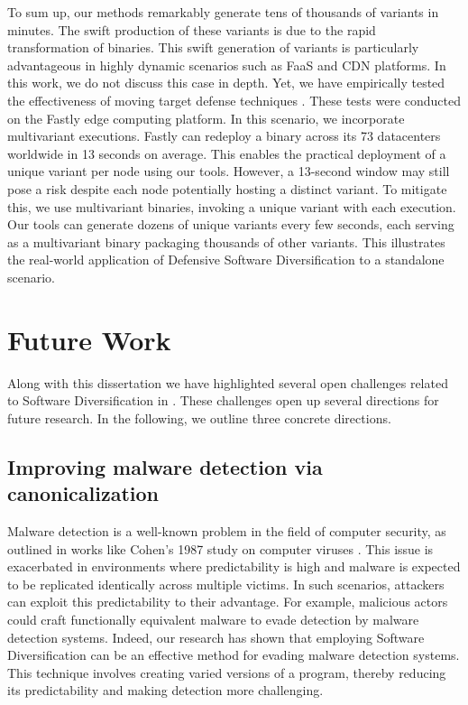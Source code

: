 To sum up, our methods remarkably generate tens of thousands of variants in minutes. 
The swift production of these variants is due to the rapid transformation of \Wasm binaries. 
This swift generation of variants is particularly advantageous in highly dynamic scenarios such as FaaS and CDN platforms. 
In this work, we do not discuss this case in depth. 
Yet, we have empirically tested the effectiveness of moving target defense techniques \cite{jackson2011compiler}. 
These tests were conducted on the Fastly edge computing platform.
In this scenario, we incorporate multivariant executions\cite{MEWE}. 
Fastly can redeploy a \Wasm binary across its 73 datacenters worldwide in 13 seconds on average. 
This enables the practical deployment of a unique variant per node using our tools. 
However, a 13-second window may still pose a risk despite each node potentially hosting a distinct \Wasm variant. 
To mitigate this, we use multivariant binaries, invoking a unique variant with each execution. 
Our tools can generate dozens of unique variants every few seconds, each serving as a multivariant binary packaging thousands of other variants. 
This illustrates the real-world application of Defensive Software Diversification to a \Wasm standalone scenario.







\section{Future Work}

Along with this dissertation we have highlighted several open challenges related to Software Diversification in \Wasm.
These challenges open up several directions for future research.
In the following, we outline three concrete directions.



\subsection{Improving \Wasm malware detection via canonicalization}

Malware detection is a well-known problem in the field of computer security, as outlined in works like Cohen's 1987 study on computer viruses \cite{cohen1987computer}. 
This issue is exacerbated in environments where predictability is high and malware is expected to be replicated identically across multiple victims. 
In such scenarios, attackers can exploit this predictability to their advantage. 
For example, malicious actors could craft functionally equivalent malware to evade detection by malware detection systems.
Indeed, our research has shown that employing Software Diversification can be an effective method for evading malware detection systems. 
This technique involves creating varied versions of a program, thereby reducing its predictability and making detection more challenging. 


